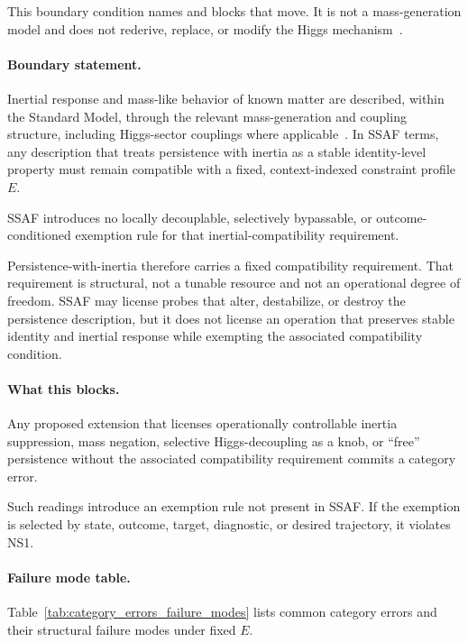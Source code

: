 \documentclass[aps,prx,onecolumn,11pt]{revtex4-2}
\theoremstyle{plain}
\theoremstyle{definition}
\theoremstyle{remark}
\begin{document}
This boundary condition names and blocks that move. It is not a
mass-generation model and does not rederive, replace, or modify the
Higgs mechanism~\cite{Higgs1964,Englert1964,ATLAS2012,CMS2012}.

\paragraph{Boundary statement.}

Inertial response and mass-like behavior of known matter are described,
within the Standard Model, through the relevant mass-generation and
coupling structure, including Higgs-sector couplings where
applicable~\cite{ATLAS2012,CMS2012}. In SSAF terms, any description
that treats persistence with inertia as a stable identity-level property
must remain compatible with a fixed, context-indexed constraint profile
\(E\).

SSAF introduces no locally decouplable, selectively bypassable, or
outcome-conditioned exemption rule for that inertial-compatibility
requirement.

Persistence-with-inertia therefore carries a fixed compatibility
requirement. That requirement is structural, not a tunable resource and
not an operational degree of freedom. SSAF may license probes that
alter, destabilize, or destroy the persistence description, but it does
not license an operation that preserves stable identity and inertial
response while exempting the associated compatibility condition.

\paragraph{What this blocks.}

Any proposed extension that licenses operationally controllable inertia
suppression, mass negation, selective Higgs-decoupling as a knob, or
``free'' persistence without the associated compatibility requirement
commits a category error.

Such readings introduce an exemption rule not present in SSAF. If the
exemption is selected by state, outcome, target, diagnostic, or desired
trajectory, it violates NS1.

\paragraph{Failure mode table.}

Table~\ref{tab:category_errors_failure_modes} lists common category
errors and their structural failure modes under fixed \(E\).
\end{document}
